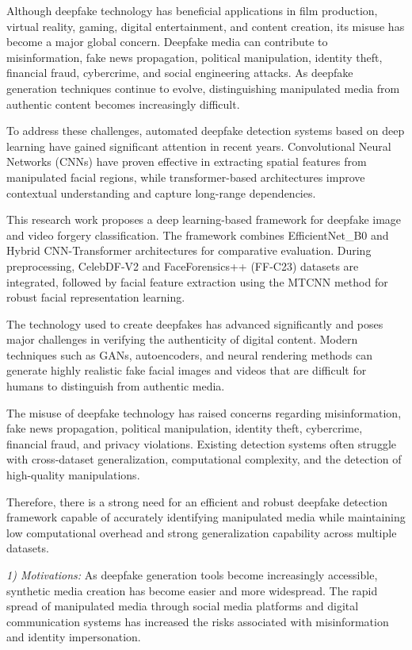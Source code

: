 \documentclass[conference]{IEEEtran}
\begin{document}
Although deepfake technology has beneficial applications in film production,
virtual reality, gaming, digital entertainment, and content creation, its
misuse has become a major global concern. Deepfake media can contribute to
misinformation, fake news propagation, political manipulation, identity theft,
financial fraud, cybercrime, and social engineering attacks. As deepfake
generation techniques continue to evolve, distinguishing manipulated media from
authentic content becomes increasingly difficult.

To address these challenges, automated deepfake detection systems based on deep
learning have gained significant attention in recent years. Convolutional Neural
Networks (CNNs) have proven effective in extracting spatial features from
manipulated facial regions, while transformer-based architectures improve
contextual understanding and capture long-range dependencies.

This research work proposes a deep learning-based framework for deepfake image
and video forgery classification. The framework combines EfficientNet\_B0 and
Hybrid CNN-Transformer architectures for comparative evaluation. During
preprocessing, CelebDF-V2 and FaceForensics++ (FF-C23) datasets are integrated,
followed by facial feature extraction using the MTCNN method for robust facial
representation learning.

The technology used to create deepfakes has advanced significantly and poses
major challenges in verifying the authenticity of digital content. Modern
techniques such as GANs, autoencoders, and neural rendering methods can generate
highly realistic fake facial images and videos that are difficult for humans to
distinguish from authentic media.

The misuse of deepfake technology has raised concerns regarding misinformation,
fake news propagation, political manipulation, identity theft, cybercrime,
financial fraud, and privacy violations. Existing detection systems often
struggle with cross-dataset generalization, computational complexity, and the
detection of high-quality manipulations.

Therefore, there is a strong need for an efficient and robust deepfake detection
framework capable of accurately identifying manipulated media while maintaining
low computational overhead and strong generalization capability across multiple
datasets.


\textit{1) Motivations:} As deepfake generation tools become increasingly
accessible, synthetic media creation has become easier and more widespread. The
rapid spread of manipulated media through social media platforms and digital
communication systems has increased the risks associated with misinformation and
identity impersonation.
\end{document}
